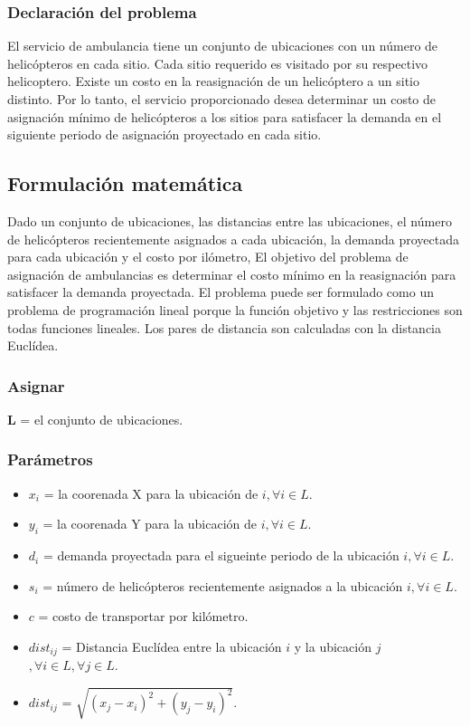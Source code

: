 \subsubsection{Declaración del problema}
El servicio de ambulancia tiene un conjunto de ubicaciones con un número de helicópteros en cada sitio.
%
Cada sitio requerido es visitado por su respectivo helicoptero.
%
Existe un costo en la reasignación de un helicóptero a un sitio distinto.
%
Por lo tanto, el servicio proporcionado desea determinar un costo de asignación mínimo de helicópteros a los sitios para satisfacer la demanda en el siguiente periodo de asignación proyectado en cada sitio.
%
\subsection{Formulación matemática}
Dado un conjunto de ubicaciones, las distancias entre las ubicaciones, el número de helicópteros recientemente asignados a cada ubicación, la demanda proyectada para cada ubicación y el costo por ilómetro,
%
El objetivo del problema de asignación de ambulancias es determinar el costo mínimo en la reasignación para satisfacer la demanda proyectada.
%
El problema puede ser formulado como un problema de programación lineal porque la función objetivo y las restricciones son todas funciones lineales.
%
Los pares de distancia son calculadas con la distancia Euclídea.
%


\subsubsection*{Asignar}
\textbf{L} = el conjunto de ubicaciones.


\subsubsection*{Parámetros}
\begin{itemize}
\item \textbf{$x_i$} = la coorenada X para la ubicación de $i, \forall i \in L$.
\item \textbf{$y_i$} = la coorenada Y para la ubicación de $i, \forall i \in L$.
\item \textbf{$d_i$} = demanda proyectada para el sigueinte periodo de la ubicación $i, \forall i \in L$.
\item \textbf{$s_i$} = número de helicópteros recientemente asignados a la ubicación $i, \forall i \in L$.
\item \textbf{$c$} = costo de transportar por kilómetro.
\item \textbf{$dist_{ij}$} = Distancia Euclídea entre la ubicación $i$ y la ubicación $j$ $, \forall i \in L, \forall j \in L$.
\item \textbf{$dist_{ij}$} = $\sqrt{ (x_j - x_i)^2 + (y_j - y_i)^2 }$.
\end{itemize}

